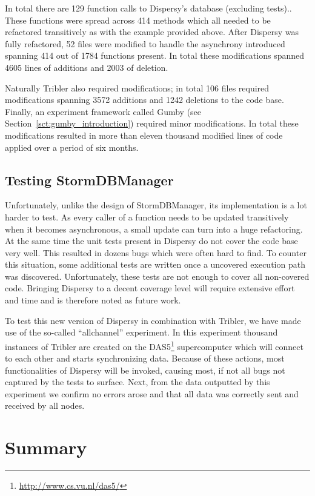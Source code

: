 In total there are 129 function calls to Dispersy's database (excluding tests)..
These functions were spread across 414 methods which all needed to be refactored transitively as with the example provided above.
After Dispersy was fully refactored, 52 files were modified to handle the asynchrony introduced spanning 414 out of 1784 functions present.
In total these modifications spanned 4605 lines of additions and 2003 of deletion.

Naturally Tribler also required modifications; in total 106 files required modifications spanning 3572 additions and 1242 deletions to the code base.
Finally, an experiment framework called Gumby (see Section~\ref{sct:gumby_introduction}) required minor modifications.
In total these modifications resulted in more than eleven thousand modified lines of code applied over a period of six months.

\subsection{Testing StormDBManager}

Unfortunately, unlike the design of StormDBManager, its implementation is a lot harder to test.
As every caller of a function needs to be updated transitively when it becomes asynchronous, a small update can turn into a huge refactoring.
At the same time the unit tests present in Dispersy do not cover the code base very well.
This resulted in dozens bugs which were often hard to find.
To counter this situation, some additional tests are written once a uncovered execution path was discovered.
Unfortunately, these tests are not enough to cover all non-covered code.
Bringing Dispersy to a decent coverage level will require extensive effort and time and is therefore noted as future work.
 
To test this new version of Dispersy in combination with Tribler, we have made use of the so-called \enquote{allchannel} experiment.
In this experiment thousand instances of Tribler are created on the DAS5\footnote{\url{http://www.cs.vu.nl/das5/}} supercomputer which will connect to each other and starts synchronizing data.
Because of these actions, most functionalities of Dispersy will be invoked, causing most, if not all bugs not captured by the tests to surface.
Next, from the data outputted by this experiment we confirm no errors arose and that all data was correctly sent and received by all nodes.

\section{Summary}

